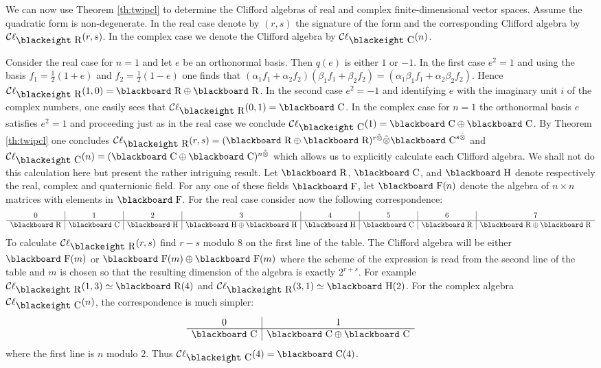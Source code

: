 \documentclass[12pt,titlepage]{article}
\def\bbf#1{\hbox{\blackboard #1}}
\def\bbfeight#1{\hbox{\blackeight #1}}
\def\lC{\bbf C}
\def\lCe{\bbfeight C}
\def\lF{\bbf F}
\def\lH{\bbf H}
\def\lR{\bbf R}
\def\lRe{\bbfeight R}
\def\cC{{\cal C}}
\def\Cl{{\cC\ell}}
\begin{document}
We can now use Theorem \ref{th:twipcl} to determine the Clifford
algebras of real and complex finite-dimensional vector spaces. Assume
the quadratic form is non-degenerate. In the real case denote by
\((r,s)\) the signature of the form and the corresponding Clifford
algebra  by \(\Cl_{\lRe}(r,s)\).
\index{\(Cl_{R}(r,s)\)@\(\Cl_{\lRe}(r,s)\)}%
 In the complex case we denote the 
Clifford
algebra by 
\index{\(Cl_{C}(n)\)@\(\Cl_{\lCe}(n)\)}%
\(\Cl_{\lCe}(n)\).

Consider the real case for \(n=1\) and let \(e\) be an orthonormal basis.
Then \(q(e)\)
is either \(1\) or \(-1\). In the first case \(e^2=1\)
and using the basis
\(f_1=\frac{1}{2}(1+e)\) and \(f_2=\frac{1}{2}(1-e)\) one finds that
\((\alpha_1f_1+\alpha_2f_2)(\beta_1f_1+\beta_2f_2)=
(\alpha_1\beta_1f_1+\alpha_2\beta_2f_2)\). Hence
\(\Cl_{\lRe}(1,0)=\lR\oplus\lR\). In the second case \(e^2=-1\)
and identifying
\(e\) with the imaginary unit \(i\)  of the complex numbers,
one easily sees that
 \(\Cl_{\lRe}(0,1)=\lC\).
In the complex case for \(n=1\) the orthonormal basis \(e\) satisfies
\(e^2=1\) and proceeding just as in the real case we conclude
\(\Cl_{\lCe}(1)=\lC\oplus\lC\). By Theorem \ref{th:twipcl} one concludes
\(\Cl_{\lRe}(r,s) = (\lR\oplus\lR)^{r\hat\otimes}
\hat\otimes\lC^{s\hat\otimes}\) and \(\Cl_{\lCe}(n) =
(\lC\oplus\lC)^{n\hat\otimes}\) which allows us to explicitly calculate
each Clifford algebra. We shall not do this calculation here but present
the rather intriguing result. Let \(\lR\), \(\lC\), and \(\lH\) denote
respectively the real, complex and quaternionic field. For any one of
these fields \(\lF\), let  \(\lF(n)\) denote the algebra of \(n\times n\)
matrices with elements in \(\lF\). For the real case consider now
the following correspondence:
\[
\begin{array}{c|c|c|c|c|c|c|c}%
 0  & 1  & 2 &  3 &  4 &  5 &  6  & 7 \\ \hline
\lR & \lC & \lH & \lH\oplus\lH & \lH & \lC & \lR & \lR\oplus\lR
\end{array}
\]
To calculate \(\Cl_{\lRe}(r,s)\) find \(r-s \) modulo \(8\) on the first
line of the table. The Clifford algebra will be either \(\lF(m)\) or
\(\lF(m)\oplus\lF(m)\) where the scheme of the expression is read from
the second line of the table and \(m\) is chosen so that the resulting
dimension of the
algebra is exactly \(2^{r+s}\).
For example \(\Cl_{\lRe}(1,3) \simeq \lR(4)\) and
\(\Cl_{\lRe}(3,1) \simeq \lH(2)\).
For the complex algebra \(\Cl_{\lCe}(n)\),
the correspondence
is much simpler:
\[
\begin{array}{c|c}%
 0  & 1   \\ \hline
\lC & \lC\oplus\lC
\end{array}
\]
where the first line is \(n\) modulo \(2\). Thus
\(\Cl_{\lCe}(4)=\lC(4)\).
\end{document}
